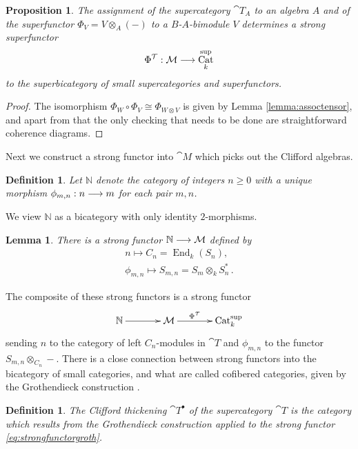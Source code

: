 \documentclass[english,letter paper,12pt,leqno]{article}
\newtheorem{proposition}[theorem]{Proposition}
\newtheorem{lemma}[theorem]{Lemma}
\theoremstyle{example}
\newtheorem{definition}[theorem]{Definition}
\numberwithin{equation}{section}
\DeclareMathOperator{\End}{End}
\DeclareMathOperator{\Cat}{Cat}
\begin{document}
\begin{proposition} The assignment of the supercategory $\cat{T}_A$ to an algebra $A$ and of the superfunctor $\Phi_V = V \otimes_A (-)$ to a $B$-$A$-bimodule $V$ determines a strong superfunctor
\[
\Phi^{\cat{T}}: \cat{M} \lto \Cat^{\operatorname{sup}}_k
\]
to the superbicategory of small supercategories and superfunctors.
\end{proposition}
\begin{proof}
The isomorphism $\Phi_W \circ \Phi_V \cong \Phi_{W \otimes V}$ is given by Lemma \ref{lemma:assoctensor}, and apart from that the only checking that needs to be done are straightforward coherence diagrams.
\end{proof}

Next we construct a strong functor into $\cat{M}$ which picks out the Clifford algebras.

\begin{definition}
Let $\mathbb{N}$ denote the category of integers $n \ge 0$ with a unique morphism $\phi_{m,n}: n \longrightarrow m$ for each pair $m,n$. %
\end{definition}

We view $\mathbb{N}$ as a bicategory with only identity $2$-morphisms.

\begin{lemma} There is a strong functor $\mathbb{N} \longrightarrow \mathcal{M}$ defined by
\begin{gather*}
n \mapsto C_n = \End_k( S_n ),\\
\phi_{m,n} \mapsto S_{m,n} = S_m \otimes_k S_n^*\,.
\end{gather*}
\end{lemma}

The composite of these strong functors is a strong functor
\begin{equation}\label{eq:strongfunctorgroth}
\xymatrix@C+1pc{
\mathbb{N} \ar[r] & \cat{M} \ar[r]^-{\Phi^{\cat{T}}} & \Cat^{\operatorname{sup}}_k
}
\end{equation}
sending $n$ to the category of left $C_n$-modules in $\cat{T}$ and $\phi_{m,n}$ to the functor $S_{m,n} \otimes_{C_n} -$. There is a close connection between strong functors into the bicategory of small categories, and what are called cofibered categories, given by the Grothendieck construction \cite{vistoli}.

\begin{definition} The \emph{Clifford thickening} $\cat{T}^\bullet$ of the supercategory $\cat{T}$ is the category which results from the Grothendieck construction applied to the strong functor \eqref{eq:strongfunctorgroth}.
\end{definition}
\end{document}
